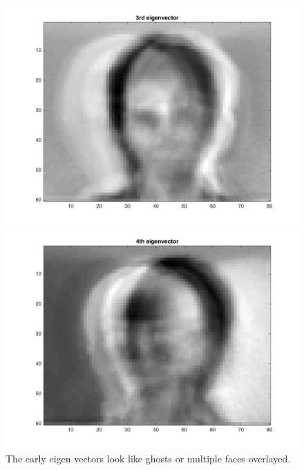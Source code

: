 \documentclass{article}
\begin{document}
\begin{figure}[H]
  \includegraphics[scale =.4]{report7_3}
  \includegraphics[scale =.4]{report7_4}
  \\The early eigen vectors look like ghosts or multiple faces overlayed.
\end{figure}
\end{document}

